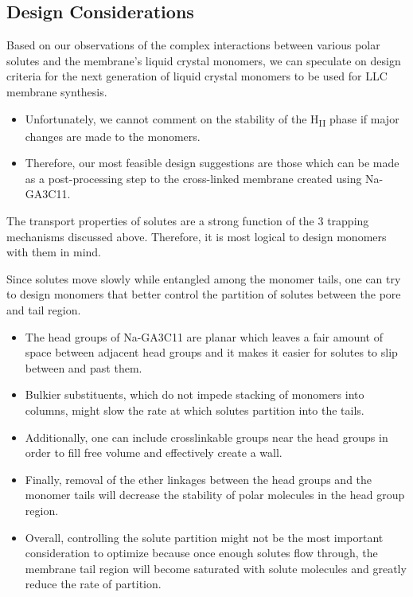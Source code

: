 \documentclass{article}
\begin{document}

  \subsection{Design Considerations}


  Based on our observations of the complex interactions between various polar solutes
  and the membrane's liquid crystal monomers, we can speculate on design criteria for 
  the next generation of liquid crystal monomers to be used for LLC membrane
  synthesis.
  \begin{itemize}
    \item Unfortunately, we cannot comment on the stability of the H\textsubscript{II}
    phase if major changes are made to the monomers.
    \item Therefore, our most feasible design suggestions are those which can be made
    as a post-processing step to the cross-linked membrane created using Na-GA3C11.
  \end{itemize}
  
  The transport properties of solutes are a strong function of the 3 trapping
  mechanisms discussed above. Therefore, it is most logical to design monomers with 
  them in mind. 
  
  Since solutes move slowly while entangled among the monomer tails, one can try to
  design monomers that better control the partition of solutes between the pore and
  tail region.
  \begin{itemize}
    \item The head groups of Na-GA3C11 are planar which leaves a fair amount of space
    between adjacent head groups and it makes it easier for solutes to slip between and
    past them.
    \item Bulkier substituents, which do not impede stacking of monomers into columns,
    might slow the rate at which solutes partition into the tails.
    \item Additionally, one can include crosslinkable groups near the head groups in
    order to fill free volume and effectively create a wall.
    \item Finally, removal of the ether linkages between the head groups and the monomer
    tails will decrease the stability of polar molecules in the head group region.
    \item Overall, controlling the solute partition might not be the most important 
    consideration to optimize because once enough solutes flow through, the membrane tail
    region will become saturated with solute molecules and greatly reduce the rate of partition.
  \end{itemize}
  
\end{document}
